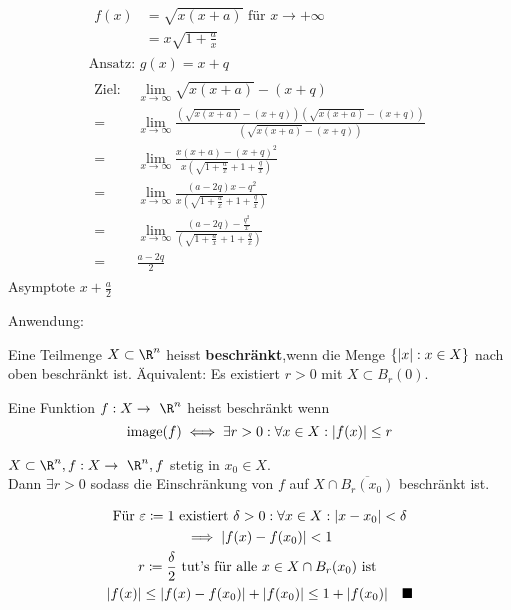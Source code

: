 \begin{bsp*}
	\begin{gather*}
		\begin{split}
			f(x)	&= \sqrt{x(x+a)} \text{ für } x \rightarrow +\infty \\
				&= x \sqrt{1 + \frac{a}{x}}
		\end{split}\\
		\text{Ansatz: } g(x) = x + q \\
		\begin{aligned}
			\text{Ziel: }	&\lim_{x \rightarrow \infty} \sqrt{x(x+a)} - (x+q) \\
			=		&\lim_{x \rightarrow \infty} \frac{(\sqrt{x(x+a)} - (x+q))(\sqrt{x(x+a)} - (x+q))}{(\sqrt{x(x+a)} - (x+q))} \\
			=		&\lim_{x \rightarrow \infty} \frac{x(x+a) - (x+q)^2}{x(\sqrt{1 + \frac{a}{x}} + 1 + \frac{q}{x})} \\
			=		&\lim_{x \rightarrow \infty} \frac{(a-2q)x - q^2}{x(\sqrt{1 + \frac{a}{x}} + 1 + \frac{q}{x})} \\
			=		&\lim_{x \rightarrow \infty} \frac{(a-2q) - \frac{q^2}{x}}{(\sqrt{1 + \frac{a}{x}} + 1 + \frac{q}{x})} \\
			=		&\frac{a - 2q}{2}
		\end{aligned}
	\end{gather*}
	Asymptote $x+\frac{a}{2}$
\end{bsp*}
Anwendung:\\
\begin{def*}[note = beschränkt , index = beschränkt]
	Eine Teilmenge $X \subset \R^n$ heisst \textbf{beschränkt},wenn die Menge $\{ \abs{x} : x \in X \}$ nach oben beschränkt ist. Äquivalent: Es existiert $r > 0$ mit $X \subset B_r(0)$.
	
	Eine Funktion $f: X \rightarrow \R^n$ heisst beschränkt wenn
	\[ \operatorname{image}(f) \iff  \exists r > 0 : \forall x \in X : \abs{f(x)} \leq r \]
	\begin{bem}
		$X \subset \R^n , f: X \rightarrow \R^n , f$ stetig in $x_0 \in X$.\\
		Dann $\exists r > 0$ sodass die Einschränkung von $f$ auf $X \cap \overline{B_r(x_0)}$ beschränkt ist. \\
		\begin{bew}
			\begin{gather*}
				\text{Für } \epsilon \coloneqq 1 \text{ existiert } \delta > 0 : \forall x \in X : \abs{x-x_0} < \delta \\
				\implies \abs{f(x)-f(x_0)} < 1 \\
				r \coloneqq \frac{\delta}{2} \text{ tut's für alle } x \in X \cap B_r(x_0) \text{ ist } \\
				\abs{f(x)} \leq \abs{f(x)-f(x_0)} + \abs{f(x_0)} \leq 1 + \abs{f(x_0)} \quad \blacksquare
			\end{gather*}
		\end{bew}
	\end{bem}
\end{def*}
